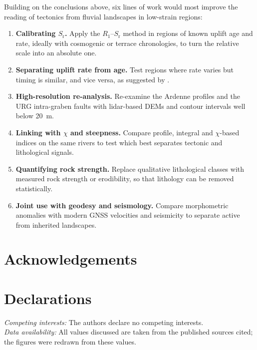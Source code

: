 \documentclass[10pt,a4paper,twocolumn]{article}
\begin{document}
Building on the conclusions above, six lines of work would most improve the reading of tectonics
from fluvial landscapes in low-strain regions:
\begin{enumerate}
  \item \textbf{Calibrating $S_\mathrm{r}$.} Apply the $R_1$--$S_\mathrm{r}$ method in regions of known uplift
        age and rate, ideally with cosmogenic or terrace chronologies, to turn the relative scale into
        an absolute one.
  \item \textbf{Separating uplift rate from age.} Test regions where rate varies but timing is similar,
        and vice versa, as suggested by \citet{Demoulin2011}.
  \item \textbf{High-resolution re-analysis.} Re-examine the Ardenne profiles and the URG
        intra-graben faults with lidar-based DEMs and contour intervals well below 20~m.
  \item \textbf{Linking with $\chi$ and steepness.} Compare profile, integral and $\chi$-based indices on
        the same rivers to test which best separates tectonic and lithological signals.
  \item \textbf{Quantifying rock strength.} Replace qualitative lithological classes with measured rock
        strength or erodibility, so that lithology can be removed statistically.
  \item \textbf{Joint use with geodesy and seismology.} Compare morphometric anomalies with modern
        GNSS velocities and seismicity to separate active from inherited landscapes.
\end{enumerate}

\section*{Acknowledgements}

\section*{Declarations}
\noindent\textit{Competing interests:} The authors declare no competing interests.\\
\textit{Data availability:} All values discussed are taken from the published sources cited; the
figures were redrawn from these values.
\end{document}

